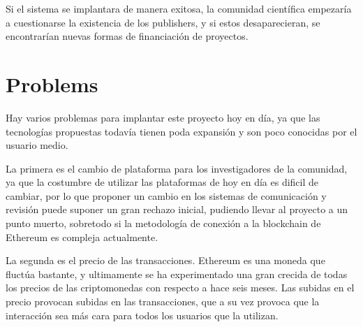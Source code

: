 Si el sistema se implantara de manera exitosa, la comunidad científica empezaría
a cuestionarse la existencia de los publishers, y si estos desaparecieran, se
encontrarían nuevas formas de financiación de proyectos.

\section{Problems}


Hay varios problemas para implantar este proyecto hoy en día, ya que las
tecnologías propuestas todavía tienen poda expansión y son poco conocidas por
el usuario medio.

La primera es el cambio de plataforma para los investigadores de la comunidad,
ya que la costumbre de utilizar las plataformas de hoy en día es dificil de
cambiar, por lo que proponer un cambio en los sistemas de comunicación y
revisión puede suponer un gran rechazo inicial, pudiendo llevar al proyecto a un
punto muerto, sobretodo si la metodología de conexión a la blockchain de
Ethereum es compleja actualmente.

La segunda es el precio de las transacciones. Ethereum es una moneda que fluctúa
bastante, y ultimamente se ha experimentado una gran crecida de todas los
precios de las criptomonedas con respecto a hace seis meses. Las subidas en el
precio provocan subidas en las transacciones, que a su vez provoca que la
interacción sea más cara para todos los usuarios que la utilizan.




